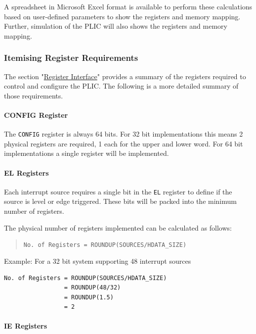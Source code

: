 A spreadsheet in Microsoft Excel format is available to perform these
calculations based on user-defined parameters to show the registers and
memory mapping. Further, simulation of the PLIC will also shows the
registers and memory mapping.

\subsubsection{Itemising Register Requirements}

The section "\protect\hyperlink{register-interface}{Register Interface}"
provides a summary of the registers required to control and configure
the PLIC. The following is a more detailed summary of those
requirements.

\paragraph{CONFIG Register}

The \texttt{CONFIG} register is always 64 bits. For 32 bit
implementations this means 2 physical registers are required, 1 each for
the upper and lower word. For 64 bit implementations a single register
will be implemented.

\paragraph{EL Registers}

Each interrupt source requires a single bit in the \texttt{EL} register
to define if the source is level or edge triggered. These bits will be
packed into the minimum number of registers.

The physical number of registers implemented can be calculated as
follows:

\begin{quote}
\texttt{No.\ of\ Registers\ =\ ROUNDUP(SOURCES/HDATA\_SIZE)}
\end{quote}

Example: For a 32 bit system supporting 48 interrupt sources

\begin{verbatim}
No. of Registers = ROUNDUP(SOURCES/HDATA_SIZE)   
                 = ROUNDUP(48/32)
                 = ROUNDUP(1.5)
                 = 2
\end{verbatim}

\paragraph{IE Registers}


